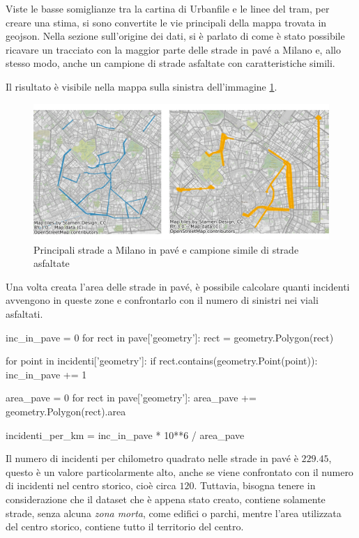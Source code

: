 \documentclass[a4paper,12pt]{report}
\newcommand{\quotestyle}[1]{\textit{#1}}
\begin{document}
Viste le basse somiglianze tra la cartina di Urbanfile e le linee del tram, 
per creare una stima, si sono convertite le vie principali della mappa trovata 
in geojson. 
Nella sezione sull'origine dei dati, si è parlato di come è stato possibile ricavare 
un tracciato con la maggior parte delle strade in pavé a Milano e, allo stesso modo, 
anche un campione di strade asfaltate con caratteristiche simili.

Il risultato è visibile nella mappa sulla sinistra dell'immagine \ref{fig:mappa-pave}.

\begin{figure}
    \includegraphics[width=\linewidth]{img_unite/mappa_pave_asfalto.png}
    \caption{Principali strade a Milano in pavé e campione simile di strade asfaltate}
    \label{fig:mappa-pave}
\end{figure}

Una volta creata l'area delle strade in pavé, è possibile calcolare quanti 
incidenti avvengono in queste zone e confrontarlo con il numero di sinistri 
nei viali asfaltati.

\begin{code}
inc_in_pave = 0
for rect in pave['geometry']: 
    rect = geometry.Polygon(rect)

    for point in incidenti['geometry']: 
        if rect.contains(geometry.Point(point)): 
            inc_in_pave += 1

area_pave = 0
for rect in pave['geometry']: 
    area_pave += geometry.Polygon(rect).area

incidenti_per_km = inc_in_pave * 10**6 / area_pave
\end{code}

Il numero di incidenti per chilometro quadrato nelle strade in pavé è $229.45$, 
questo è un valore particolarmente alto, anche se viene confrontato con il numero di 
incidenti nel centro storico, cioè circa $120$.
Tuttavia, bisogna tenere in considerazione che il dataset che è appena stato creato, 
contiene solamente strade, senza alcuna \quotestyle{zona morta}, 
come edifici o parchi, mentre l'area utilizzata 
del centro storico, contiene tutto il territorio del centro.
\end{document}
